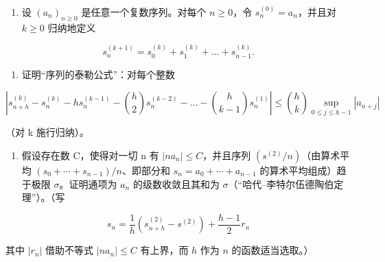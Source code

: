 \begin{enumerate}
\def\labelenumi{\arabic{enumi})}
\setcounter{enumi}{17}
\tightlist
\item
  设 \((a_{n})_{n\geqslant 0}\) 是任意一个复数序列。对每个 \(n\geqslant 0\)，令 \(s_n^{(0)} = a_n\)，并且对 \(k\geqslant 0\) 归纳地定义
\end{enumerate}

\[
s _ {n} ^ {(k + 1)} = s _ {0} ^ {(k)} + s _ {1} ^ {(k)} + \dots + s _ {n - 1} ^ {(k)}.
\]

\begin{enumerate}
\def\labelenumi{\alph{enumi})}
\tightlist
\item
  证明“序列的泰勒公式”：对每个整数
\end{enumerate}

\[
\left| s _ {n + h} ^ {(k)} - s _ {n} ^ {(k)} - h s _ {n} ^ {(k - 1)} - \binom {h} {2} s _ {n} ^ {(k - 2)} - \dots - \binom {h} {k - 1} s _ {n} ^ {(1)} \right| \leqslant \binom {h} {k} \sup _ {0 \leqslant j \leqslant h - 1} | a _ {n + j} |
\]

（对 k 施行归纳）。

\begin{enumerate}
\def\labelenumi{\alph{enumi})}
\setcounter{enumi}{1}
\tightlist
\item
  假设存在数 C，使得对一切 n 有 \(|na_{n}| \leqslant C\)，并且序列 \((s^{(2)}/n)\)（由算术平均 \((s_{0} + \cdots + s_{n-1})/n\)、即部分和 \(s_{n} = a_{0} + \cdots + a_{n-1}\) 的算术平均组成）趋于极限 \(\sigma\)。证明通项为 \(a_{n}\) 的级数收敛且其和为 \(\sigma\)（“哈代–李特尔伍德陶伯定理”）。（写
\end{enumerate}

\[
s _ {n} = \frac {1}{h} \left(s _ {n + h} ^ {(2)} - s ^ {(2)}\right) + \frac {h - 1}{2} r _ {n}
\]

其中 \(|r_n|\) 借助不等式 \(|na_n| \leqslant C\) 有上界，而 \(h\) 作为 \(n\) 的函数适当选取。）

\setcounter{exercisegroup}{3}
